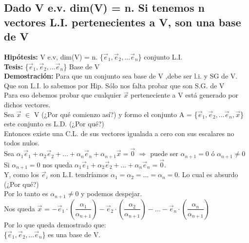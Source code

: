 \documentclass[11pt]{article}
\begin{document}
\subsection{Dado V e.v. dim(V) = n. Si tenemos n vectores L.I. pertenecientes a V, son una base de V}
{\bfseries {Hipótesis:}} V e.v, dim(V) = n. \{$\vec{e}_{1}, \vec{e}_2,... \vec{e}_n $\} conjunto L.I. \\
{\bfseries {Tesis:}} \{$\vec{e}_{1}, \vec{e}_2,... \vec{e}_n $\} Base de V\\
{\bfseries Demostración:} Para que un conjunto sea base de V ,debe ser l.i. y SG de V. \\
Que son L.I. lo sabemos por Hip. Sólo nos falta probar que son S.G. de V\\
Para eso debemos probar que cualquier $\vec{x}$ perteneciente a V está generado por dichos vectores. \\
Sea $\vec{x}$ $\in$ V (¿Por qué comienzo así?) y formo el conjunto A = \{$\vec{e}_{1}, \vec{e}_2,... \vec{e}_n, \vec{x} $\} este conjunto es L.D. (¿Por qué?)\\
Entonces existe una C.L. de sus vectores igualada a cero con sus escalares no todos nulos. \\
Sea $\alpha_1\vec{e}_1+\alpha_2\vec{e}_2+\hdots+\alpha_n\vec{e}_{n} + \alpha_{n+1}\vec{x} = \vec{0}$ $\Rightarrow$ puede ser $\alpha_{n+1} = 0$ ó $\alpha_{n+1} \neq 0$\\
Si $\alpha_{n+1} = 0$ nos queda $\alpha_1\vec{e}_1+\alpha_2\vec{e}_2+\hdots+\alpha_n\vec{e}_{n}= \vec{0}$. 
\\Y, como los $\vec{e}_i$ son L.I. tendríamos $\alpha_1 = \alpha_2 = \hdots = \alpha_n = 0$. Lo cual es absurdo (¿Por qué?)\\
Por lo tanto es $\alpha_{n+1} \neq 0$ y podemos despejar.\\
Nos queda $\vec{x}$ = $-\vec{e}_1 \cdot (\dfrac{\alpha_1}{\alpha_{n+1}}) - \vec{e}_2 \cdot (\dfrac{\alpha_{2}}{\alpha_{n+1}}) - \hdots - \vec{e}_n \cdot (\dfrac{\alpha_n}{\alpha_{n+1}})$\\
Por lo que queda demostrado que: \\
\{$\vec{e}_{1}, \vec{e}_2,... \vec{e}_n $\} es una base de V.
\end{document}

